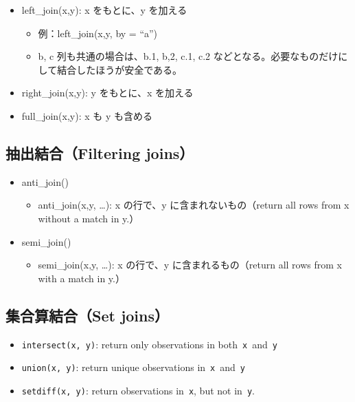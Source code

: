 \documentclass[
  xelatex, ja=standard]{bxjsbook}
\providecommand{\tightlist}{%
  \setlength{\itemsep}{0pt}\setlength{\parskip}{0pt}}
\theoremstyle{definition}
\theoremstyle{definition}
\theoremstyle{definition}
\theoremstyle{definition}
\theoremstyle{remark}
\begin{document}
\begin{itemize}
\item
  left\_join(x,y): x をもとに、y を加える

  \begin{itemize}
  \item
    例：left\_join(x,y, by = ``a'')
  \item
    b, c 列も共通の場合は、b.1, b,2, c.1, c.2 などとなる。必要なものだけにして結合したほうが安全である。
  \end{itemize}
\item
  right\_join(x,y): y をもとに、x を加える
\item
  full\_join(x,y): x も y も含める
\end{itemize}

\hypertarget{ux62bdux51faux7d50ux5408filtering-joins}{%
\subsection{抽出結合（Filtering joins）}\label{ux62bdux51faux7d50ux5408filtering-joins}}

\begin{itemize}
\tightlist
\item
  anti\_join()

  \begin{itemize}
  \tightlist
  \item
    anti\_join(x,y, \ldots): x の行で、y に含まれないもの（return all rows from x without a match in y.）
  \end{itemize}
\item
  semi\_join()

  \begin{itemize}
  \tightlist
  \item
    semi\_join(x,y, \ldots): x の行で、y に含まれるもの（return all rows from x with a match in y.）
  \end{itemize}
\end{itemize}

\hypertarget{ux96c6ux5408ux7b97ux7d50ux5408set-joins}{%
\subsection{集合算結合（Set joins）}\label{ux96c6ux5408ux7b97ux7d50ux5408set-joins}}

\begin{itemize}
\tightlist
\item
  \texttt{intersect(x,\ y)}: return only observations in both~\texttt{x}~and~\texttt{y}
\item
  \texttt{union(x,\ y)}: return unique observations in~\texttt{x}~and~\texttt{y}
\item
  \texttt{setdiff(x,\ y)}: return observations in~\texttt{x}, but not in~\texttt{y}.
\end{itemize}
\end{document}
